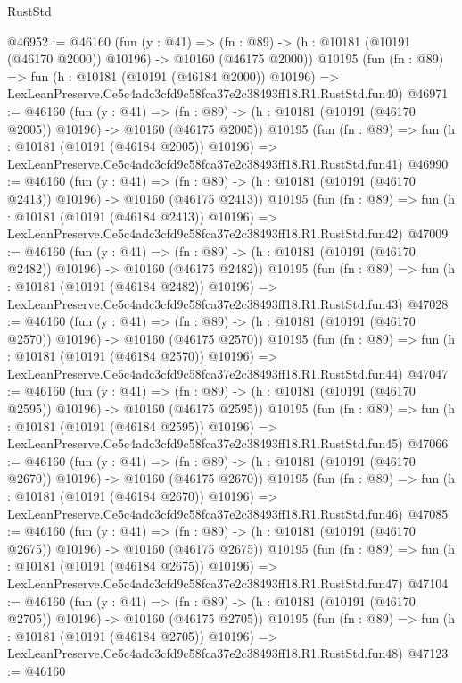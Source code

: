 \begin{lexlean}{RustStd}
\begin{coremodule}
@46952 := @46160
    (fun (y : @41) =>
    (fn : @89) -> (h : @10181 (@10191 (@46170 @2000)) @10196) -> @10160 (@46175 @2000))
    @10195
    (fun (fn : @89) =>
    fun (h : @10181 (@10191 (@46184 @2000)) @10196) =>
    LexLeanPreserve.Ce5c4adc3cfd9c58fca37e2c38493ff18.R1.RustStd.fun40)
@46971 := @46160
    (fun (y : @41) =>
    (fn : @89) -> (h : @10181 (@10191 (@46170 @2005)) @10196) -> @10160 (@46175 @2005))
    @10195
    (fun (fn : @89) =>
    fun (h : @10181 (@10191 (@46184 @2005)) @10196) =>
    LexLeanPreserve.Ce5c4adc3cfd9c58fca37e2c38493ff18.R1.RustStd.fun41)
@46990 := @46160
    (fun (y : @41) =>
    (fn : @89) -> (h : @10181 (@10191 (@46170 @2413)) @10196) -> @10160 (@46175 @2413))
    @10195
    (fun (fn : @89) =>
    fun (h : @10181 (@10191 (@46184 @2413)) @10196) =>
    LexLeanPreserve.Ce5c4adc3cfd9c58fca37e2c38493ff18.R1.RustStd.fun42)
@47009 := @46160
    (fun (y : @41) =>
    (fn : @89) -> (h : @10181 (@10191 (@46170 @2482)) @10196) -> @10160 (@46175 @2482))
    @10195
    (fun (fn : @89) =>
    fun (h : @10181 (@10191 (@46184 @2482)) @10196) =>
    LexLeanPreserve.Ce5c4adc3cfd9c58fca37e2c38493ff18.R1.RustStd.fun43)
@47028 := @46160
    (fun (y : @41) =>
    (fn : @89) -> (h : @10181 (@10191 (@46170 @2570)) @10196) -> @10160 (@46175 @2570))
    @10195
    (fun (fn : @89) =>
    fun (h : @10181 (@10191 (@46184 @2570)) @10196) =>
    LexLeanPreserve.Ce5c4adc3cfd9c58fca37e2c38493ff18.R1.RustStd.fun44)
@47047 := @46160
    (fun (y : @41) =>
    (fn : @89) -> (h : @10181 (@10191 (@46170 @2595)) @10196) -> @10160 (@46175 @2595))
    @10195
    (fun (fn : @89) =>
    fun (h : @10181 (@10191 (@46184 @2595)) @10196) =>
    LexLeanPreserve.Ce5c4adc3cfd9c58fca37e2c38493ff18.R1.RustStd.fun45)
@47066 := @46160
    (fun (y : @41) =>
    (fn : @89) -> (h : @10181 (@10191 (@46170 @2670)) @10196) -> @10160 (@46175 @2670))
    @10195
    (fun (fn : @89) =>
    fun (h : @10181 (@10191 (@46184 @2670)) @10196) =>
    LexLeanPreserve.Ce5c4adc3cfd9c58fca37e2c38493ff18.R1.RustStd.fun46)
@47085 := @46160
    (fun (y : @41) =>
    (fn : @89) -> (h : @10181 (@10191 (@46170 @2675)) @10196) -> @10160 (@46175 @2675))
    @10195
    (fun (fn : @89) =>
    fun (h : @10181 (@10191 (@46184 @2675)) @10196) =>
    LexLeanPreserve.Ce5c4adc3cfd9c58fca37e2c38493ff18.R1.RustStd.fun47)
@47104 := @46160
    (fun (y : @41) =>
    (fn : @89) -> (h : @10181 (@10191 (@46170 @2705)) @10196) -> @10160 (@46175 @2705))
    @10195
    (fun (fn : @89) =>
    fun (h : @10181 (@10191 (@46184 @2705)) @10196) =>
    LexLeanPreserve.Ce5c4adc3cfd9c58fca37e2c38493ff18.R1.RustStd.fun48)
@47123 := @46160

\end{coremodule}
\end{lexlean}
